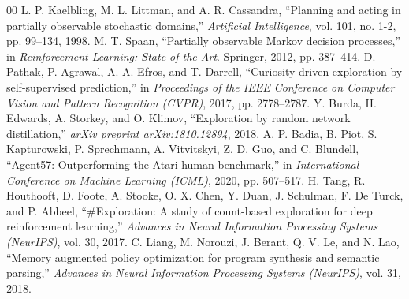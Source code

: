 \documentclass[conference]{IEEEtran}
\begin{document}
\begin{thebibliography}{00}
 L. P. Kaelbling, M. L. Littman, and A. R. Cassandra, ``Planning and acting in partially observable stochastic domains,'' \textit{Artificial Intelligence}, vol. 101, no. 1-2, pp. 99--134, 1998.
 M. T. Spaan, ``Partially observable Markov decision processes,'' in \textit{Reinforcement Learning: State-of-the-Art}. Springer, 2012, pp. 387--414.
 D. Pathak, P. Agrawal, A. A. Efros, and T. Darrell, ``Curiosity-driven exploration by self-supervised prediction,'' in \textit{Proceedings of the IEEE Conference on Computer Vision and Pattern Recognition (CVPR)}, 2017, pp. 2778--2787.
 Y. Burda, H. Edwards, A. Storkey, and O. Klimov, ``Exploration by random network distillation,'' \textit{arXiv preprint arXiv:1810.12894}, 2018.
 A. P. Badia, B. Piot, S. Kapturowski, P. Sprechmann, A. Vitvitskyi, Z. D. Guo, and C. Blundell, ``Agent57: Outperforming the Atari human benchmark,'' in \textit{International Conference on Machine Learning (ICML)}, 2020, pp. 507--517.
 H. Tang, R. Houthooft, D. Foote, A. Stooke, O. X. Chen, Y. Duan, J. Schulman, F. De Turck, and P. Abbeel, ``\#Exploration: A study of count-based exploration for deep reinforcement learning,'' \textit{Advances in Neural Information Processing Systems (NeurIPS)}, vol. 30, 2017.
 C. Liang, M. Norouzi, J. Berant, Q. V. Le, and N. Lao, ``Memory augmented policy optimization for program synthesis and semantic parsing,'' \textit{Advances in Neural Information Processing Systems (NeurIPS)}, vol. 31, 2018.
\end{thebibliography}
\end{document}
